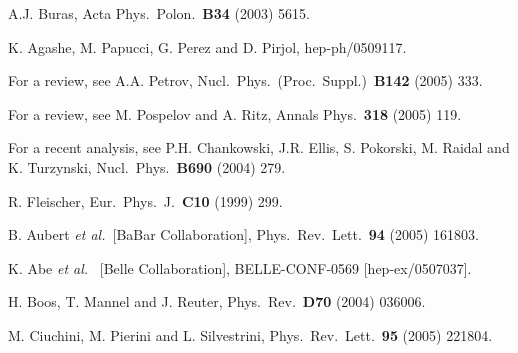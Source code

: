 \documentclass[11pt]{cernrep}
\begin{document}
\begin{thebibliography}{999}
  A.J. Buras,
  { Acta Phys.\ Polon.}~{\bf B34} (2003) 5615.
  
K. Agashe, M. Papucci, G. Perez and D. Pirjol,
hep-ph/0509117.

For a review, see A.A. Petrov,
  { Nucl.\ Phys.\ (Proc.\ Suppl.)}~{\bf B142} (2005) 333.

For a review, see M. Pospelov and A. Ritz,
  { Annals Phys.}~{\bf 318} (2005) 119.
 
For a recent analysis, see
P.H. Chankowski, J.R. Ellis, S. Pokorski, M. Raidal and K. Turzynski,
  { Nucl.\ Phys.}~{\bf B690} (2004) 279.

R. Fleischer,
  { Eur.\ Phys.\ J.}~{\bf C10} (1999) 299.

B. Aubert {\it et al.}\  [BaBar Collaboration],
    { Phys.\ Rev.\ Lett.}~{\bf 94} (2005) 161803.

K. Abe {\it et al.} \ [Belle Collaboration],
  BELLE-CONF-0569 [hep-ex/0507037].

H. Boos, T. Mannel and J. Reuter,
  { Phys.\ Rev.}~{\bf D70} (2004) 036006.
  
M. Ciuchini, M. Pierini and L. Silvestrini,
  Phys.\ Rev.\ Lett.\  {\bf 95} (2005) 221804.
  

\end{thebibliography}
\end{document}
